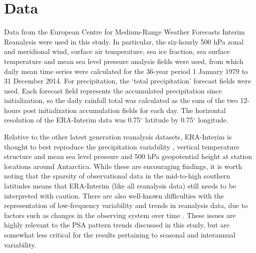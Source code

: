 \section{Data}

Data from the European Centre for Medium-Range Weather Forecasts Interim Reanalysis \citep[ERA-Interim;][]{Dee2011} were used in this study. In particular, the six-hourly 500 hPa zonal and meridional wind, surface air temperature, sea ice fraction, sea surface temperature and mean sea level pressure analysis fields were used, from which daily mean time series were calculated for the 36-year period 1 January 1979 to 31 December 2014. For precipitation, the `total precipitation' forecast fields were used. Each forecast field represents the accumulated precipitation since initialization, so the daily rainfall total was calculated as the sum of the two 12-hours post initialization accumulation fields for each day. The horizontal resolution of the ERA-Interim data was 0.75$^{\circ}$ latitude by 0.75$^{\circ}$ longitude.  

Relative to the other latest generation reanalysis datasets, ERA-Interim is thought to best reproduce the precipitation variability \citep{Bromwich2011,Nicolas2011}, vertical temperature structure \citep{Screen2012} and mean sea level pressure and 500 hPa geopotential height at station locations \citep{Bracegirdle2012} around Antarctica. While these are encouraging findings, it is worth noting that the sparsity of observational data in the mid-to-high southern latitudes means that ERA-Interim (like all reanalysis data) still needs to be interpreted with caution. There are also well-known difficulties with the representation of low-frequency variability and trends in reanalysis data, due to factors such as changes in the observing system over time \citep{Dee2014}. These issues are highly relevant to the PSA pattern trends discussed in this study, but are somewhat less critical for the results pertaining to seasonal and interannual variability.
